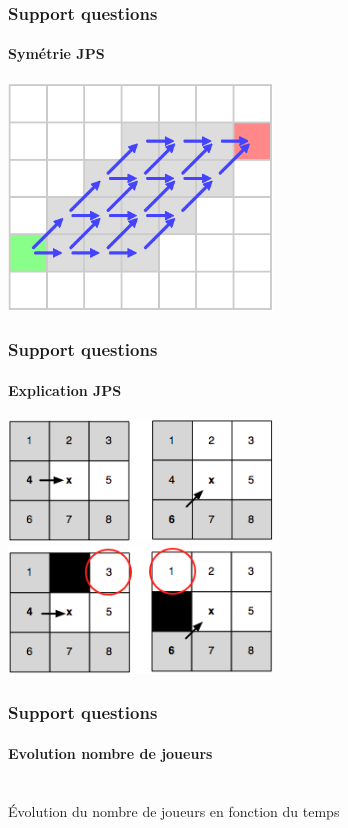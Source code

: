 \documentclass{beamer}
\begin{document}
\begin{frame}
  \frametitle{Support questions}
  \framesubtitle{Symétrie JPS}
  \centering
  \includegraphics[width=7cm]{symetrie_JPS.png}
\end{frame}
\begin{frame}
  \frametitle{Support questions}
  \framesubtitle{Explication JPS}
  \centering
  \includegraphics[width=7cm]{explo_jps.png}\\
  \includegraphics[width=7cm]{jmp_point_jps.png}
\end{frame}
\begin{frame}
  \frametitle{Support questions}
  \framesubtitle{Evolution nombre de joueurs}
  \centering
  \\[1cm]
  \'Evolution du nombre de joueurs en fonction du temps
\end{frame}
\end{document}
